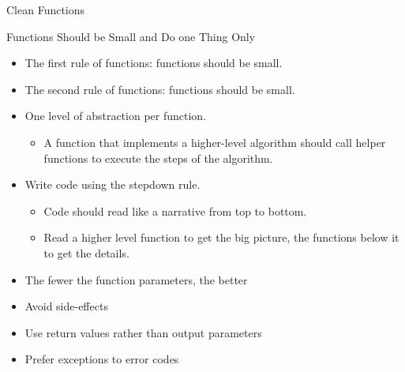 \documentclass{beamer}
\begin{document}
\begin{frame}[fragile]{Clean Functions}


Functions Should be Small and Do one Thing Only
\begin{itemize}
\item The first rule of functions: functions should be small.
\item The second rule of functions: functions should be small.
\end{itemize}

\begin{itemize}
\item One level of abstraction per function.
\begin{itemize}
\item A function that implements a higher-level algorithm should call helper functions to execute the steps of the algorithm.
\end{itemize}
\item Write code using the stepdown rule.
\begin{itemize}
\item Code should read like a narrative from top to bottom.
\item Read a higher level function to get the big picture, the functions below it to get the details.
\end{itemize}
\item The fewer the function parameters, the better
\item Avoid side-effects
\item Use return values rather than output parameters
\item Prefer exceptions to error codes
\end{itemize}

\end{frame}
\end{document}
